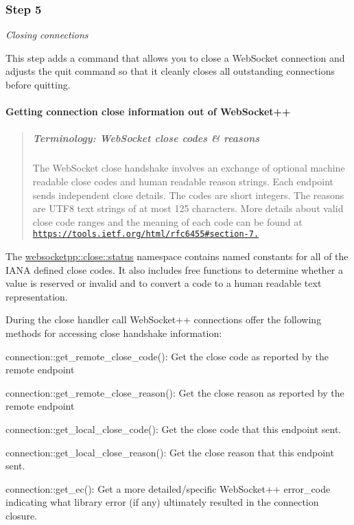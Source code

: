 \subsubsection*{Step 5}

{\itshape Closing connections}

This step adds a command that allows you to close a Web\+Socket connection and adjusts the quit command so that it cleanly closes all outstanding connections before quitting.

\paragraph*{Getting connection close information out of Web\+Socket++}

\begin{quote}
\subparagraph*{Terminology\+: Web\+Socket close codes \& reasons}

The Web\+Socket close handshake involves an exchange of optional machine readable close codes and human readable reason strings. Each endpoint sends independent close details. The codes are short integers. The reasons are U\+T\+F8 text strings of at most 125 characters. More details about valid close code ranges and the meaning of each code can be found at \href{https://tools.ietf.org/html/rfc6455#section-7.4}{\tt https\+://tools.\+ietf.\+org/html/rfc6455\#section-\/7.} \end{quote}


The {\ttfamily \mbox{\hyperlink{namespacewebsocketpp_1_1close_1_1status}{websocketpp\+::close\+::status}}} namespace contains named constants for all of the I\+A\+NA defined close codes. It also includes free functions to determine whether a value is reserved or invalid and to convert a code to a human readable text representation.

During the close handler call Web\+Socket++ connections offer the following methods for accessing close handshake information\+:


\begin{DoxyItemize}
\item {\ttfamily connection\+::get\+\_\+remote\+\_\+close\+\_\+code()}\+: Get the close code as reported by the remote endpoint
\item {\ttfamily connection\+::get\+\_\+remote\+\_\+close\+\_\+reason()}\+: Get the close reason as reported by the remote endpoint
\item {\ttfamily connection\+::get\+\_\+local\+\_\+close\+\_\+code()}\+: Get the close code that this endpoint sent.
\item {\ttfamily connection\+::get\+\_\+local\+\_\+close\+\_\+reason()}\+: Get the close reason that this endpoint sent.
\item {\ttfamily connection\+::get\+\_\+ec()}\+: Get a more detailed/specific Web\+Socket++ {\ttfamily error\+\_\+code} indicating what library error (if any) ultimately resulted in the connection closure.
\end{DoxyItemize}

